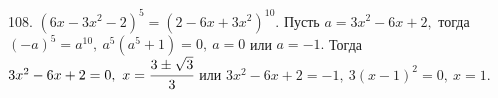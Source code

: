108. $(6x-3x^2-2)^5=(2-6x+3x^2)^{10}.$ Пусть $a=3x^2-6x+2,$ тогда $(-a)^5=a^{10},\ a^5(a^5+1)=0,\ a=0$ или $a=-1.$ Тогда $3x^2-6x+2=0,\ x=\cfrac{3\pm\sqrt{3}}{3}$ или $3x^2-6x+2=-1,\ 3(x-1)^2=0,\ x=1.$\\
